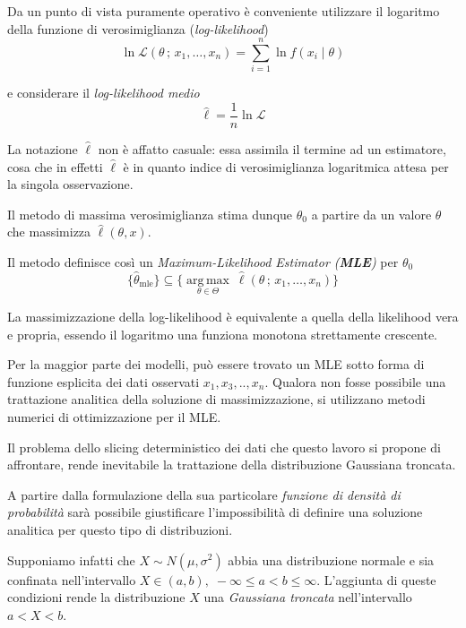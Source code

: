 \documentclass[12pt,openright,twoside,a4paper]{book}
\begin{document}
Da un punto di vista puramente operativo è conveniente utilizzare il logaritmo della funzione di verosimiglianza (\textit{log-likelihood})
 \begin{equation}
 \ln\mathcal{L}(\theta\,;\,x_1,\ldots,x_n) = \sum_{i=1}^n \ln f(x_i\mid\theta)
 \end{equation}

e considerare il \textit{log-likelihood medio}
\begin{equation}
\hat\ell = \frac1n \ln\mathcal{L}
\end{equation}

La notazione $\hat\ell$ non è affatto casuale: essa assimila il termine ad un estimatore, cosa che in effetti $\hat\ell$ è in quanto indice di verosimiglianza logaritmica attesa per la singola osservazione.

Il metodo di massima verosimiglianza stima dunque $\theta_0$ a partire da un valore $\theta$ che massimizza $\hat\ell(\theta,x)$.

Il metodo definisce così un \textit{Maximum-Likelihood Estimator (\textbf{MLE}) } per $\theta_0$
\begin{equation}
\{ \hat\theta_\mathrm{mle}\} \subseteq \{ \underset{\theta\in\Theta}{\operatorname{arg\,max}}\ \hat\ell(\theta\,;\,x_1,\ldots,x_n) \}
\end{equation}

La massimizzazione della log-likelihood è equivalente a quella della likelihood vera e propria, essendo il logaritmo una funziona monotona strettamente crescente. \cite{MLE}

Per la maggior parte dei modelli, può essere trovato un MLE sotto forma di funzione esplicita dei dati osservati $x_1,x_3,..,x_n$.
Qualora non fosse possibile una trattazione analitica della soluzione di massimizzazione, si utilizzano metodi numerici di ottimizzazione per il MLE.

Il problema dello slicing deterministico dei dati che questo lavoro si propone di affrontare, rende inevitabile la trattazione della distribuzione Gaussiana troncata.

A partire dalla formulazione della sua particolare \textit{funzione di densità di probabilità} sarà possibile giustificare l'impossibilità di definire una soluzione analitica per questo tipo di distribuzioni.

Supponiamo infatti che  $X \sim N(\mu, \sigma^{2}) \!$ abbia una distribuzione normale e sia confinata nell'intervallo $ X \in (a,b), \; -\infty \leq a < b \leq \infty $.
L'aggiunta di queste  condizioni rende la distribuzione $X$ una \textit{Gaussiana troncata} nell'intervallo
$a<X<b$.
\end{document}
